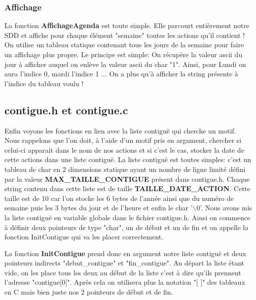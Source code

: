 \documentclass[12pt,french]{article} %
\begin{document}
\subsubsection{Affichage}

La fonction \textbf{AffichageAgenda} est toute simple. Elle parcourt entièrement notre SDD et affiche pour chaque élément "semaine" toutes les actions qu'il contient ! On utilise un tableau statique contenant tous les jours de la semaine pour faire un affichage plus propre. Le principe est simple: On récupère la valeur ascii du jour à afficher auquel on enlève la valeur ascii du char "1". Ainsi, pour Lundi on aura l'indice 0, mardi l'indice 1 ... On a plus qu'à afficher la string présente à l'indice du tableau voulu !  

\subsection{contigue.h et contigue.c}

Enfin voyons les fonctions en lien avec la liste contiguë qui cherche un motif. Nous rappelons que l'on doit, à l'aide d'un motif pris en argument, chercher si celui-ci apparait dans le nom de nos actions et si c'est le cas, stocker la date de cette actions dans une liste contiguë.\newline
La liste contiguë est toutes simples: c'est un tableau de char en 2 dimensions statique ayant un nombre de ligne limité défini par la valeur \textbf{MAX\_TAILLE\_CONTIGUE} présent dans contigue.h. Chaque string contenu dans cette liste est de taille \textbf{TAILLE\_DATE\_ACTION}. Cette taille est de 10 car l'on stocke les 6 bytes de l'année ainsi que du numéro de semaine puis les 3 bytes du jour et de l'heure et enfin le char '$\backslash$0'. Nous avons mis la liste contiguë en variable globale dans le fichier contigue.h. Ainsi on commence à définir deux pointeurs de type "char", un de début et un de fin et on appelle la fonction InitContigue qui va les placer correctement.\newline

La fonction \textbf{InitContigue} prend donc en argument notre liste contiguë et deux pointeurs indirects "debut\_contigue" et "fin\_contigue". Au départ la liste étant vide, on les place tous les deux au début de la liste c'est à dire qu'ils prennent l'adresse "contigue[0]". Après cela on utilisera plus la notation "[ ]" des tableaux en C mais bien juste nos 2 pointeurs de début et de fin.
\end{document}
